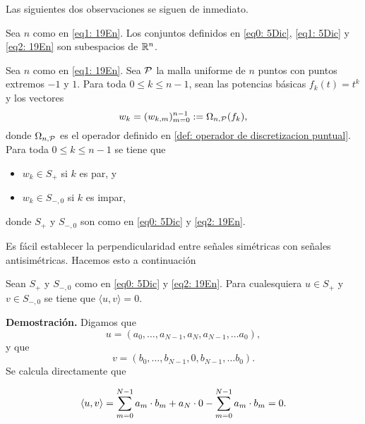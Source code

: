 Las siguientes dos observaciones se siguen de inmediato.

\begin{obs}
\label{obs: espacios de senales sim y antisim}
Sea $n$ como en \eqref{eq1: 19En}. 
Los conjuntos definidos en 
\eqref{eq0: 5Dic}, \eqref{eq1: 5Dic} y  \eqref{eq2: 19En}
son subespacios de $\mathbb{R}^{n}$.
\end{obs}

\begin{obs}
\label{obs: pertenencia}
Sea $n$ como en \eqref{eq1: 19En}. 
Sea $\mathcal{P}$ la malla
uniforme de $n$ puntos con puntos extremos $-1$ y $1$.
Para toda $0 \leq k \leq n-1$, sean
las potencias básicas $f_{k}(t)=t^{k}$ y los vectores
\begin{equation}
\label{eq4: 10Dic}
w_{k}=(w_{k,m})_{m=0}^{n-1} := \Omega_{n, \mathcal{P}}(f_{k}),
\end{equation}
donde $\Omega_{n, \mathcal{P}}$ es el operador definido en 
\ref{def: operador de discretizacion puntual}.
Para toda $0 \leq k \leq n-1$ se tiene que
\begin{itemize}
\item $w_{k} \in S_{+}$ si $k$ es par, y
\item $w_{k} \in S_{-,0}$ si $k$ es impar,
\end{itemize}
donde $S_{+}$ y $S_{-,0}$ son como en 
\eqref{eq0: 5Dic} y \eqref{eq2: 19En}.
\end{obs}

Es fácil establecer la perpendicularidad entre
señales simétricas con señales antisimétricas.
Hacemos esto a continuación

\begin{lema}
\label{lema: ortogonalidad entre sim y antisim}
Sean $S_{+}$ y $S_{-,0}$ como en 
\eqref{eq0: 5Dic} y \eqref{eq2: 19En}. Para cualesquiera 
$u \in S_{+}$ y $v \in S_{-,0}$ se tiene que
$\langle u, v \rangle=0$.
\end{lema}
\noindent
\textbf{Demostración.}
Digamos que 
\begin{equation*}
u=(a_{0}, \ldots , a_{N-1}, a_{N}, a_{N-1}, \ldots a_{0}),
\end{equation*}
y que 
\begin{equation*}
v=(b_{0}, \ldots , b_{N-1}, 0, b_{N-1}, \ldots b_{0}).
\end{equation*}
Se calcula directamente que 

\[
\langle u, v \rangle = \sum\limits_{m=0}^{N-1}a_{m} \cdot b_{m} + a_{N} \cdot 0
-\sum\limits_{m=0}^{N-1}a_{m} \cdot b_{m} =0.
\]

